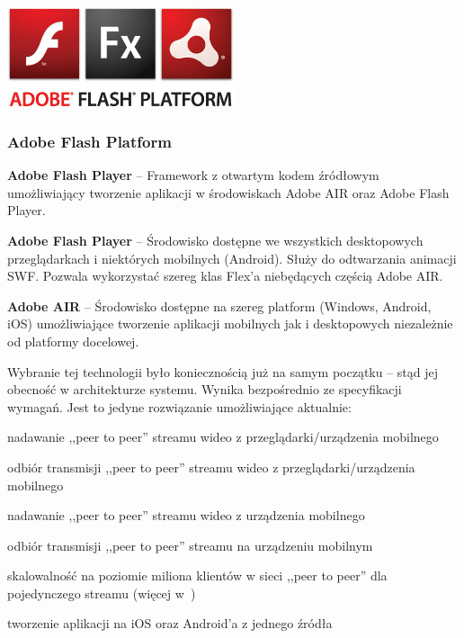\begin{minipage}{\textwidth}
    \begin{center}
        \includegraphics[width=0.5\textwidth]{img/logos/adobe-flash-platform.jpg}
    \end{center}
    \subsubsection{Adobe Flash Platform}
    \begin{packed_item}
        \item{\textbf{Adobe Flash Player} -- Framework z otwartym kodem źródłowym umożliwiający tworzenie aplikacji w środowiskach Adobe AIR oraz Adobe Flash Player.}
        \item{\textbf{Adobe Flash Player} --  Środowisko dostępne we wszystkich desktopowych przeglądarkach i niektórych mobilnych (Android). Służy do odtwarzania animacji SWF. Pozwala wykorzystać szereg klas Flex'a niebędących częścią Adobe AIR.}
        \item{\textbf{Adobe AIR} -- Środowisko dostępne na szereg platform (Windows, Android, iOS) umożliwiające tworzenie aplikacji mobilnych jak i desktopowych niezależnie od platformy docelowej.}
    \end{packed_item}

    Wybranie tej technologii było koniecznością już na samym początku -- stąd jej obecność w architekturze systemu. Wynika bezpośrednio ze specyfikacji wymagań. Jest to jedyne rozwiązanie umożliwiające aktualnie:
    \begin{packed_item}
        \item{nadawanie ,,peer to peer'' streamu wideo z przeglądarki/urządzenia mobilnego}
        \item{odbiór transmisji ,,peer to peer'' streamu wideo z przeglądarki/urządzenia mobilnego}
        \item{nadawanie ,,peer to peer'' streamu wideo z urządzenia mobilnego}
        \item{odbiór transmisji ,,peer to peer'' streamu na urządzeniu mobilnym}
        \item{skalowalność na poziomie miliona klientów w sieci ,,peer to peer'' dla pojedynczego streamu (więcej w~\cite{MattKauf2009})}
        \item{tworzenie aplikacji na iOS oraz Android'a z jednego źródła}
    \end{packed_item}


\end{minipage}
